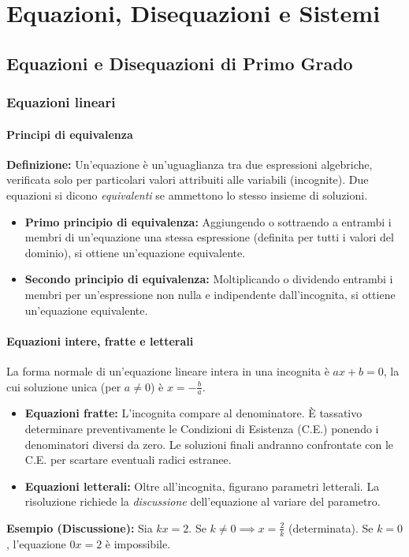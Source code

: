 \chapter{Equazioni, Disequazioni e Sistemi}

\section{Equazioni e Disequazioni di Primo Grado}
\subsection{Equazioni lineari}
\subsubsection{Principi di equivalenza}
\textbf{Definizione:} Un'equazione è un'uguaglianza tra due espressioni algebriche, verificata solo per particolari valori attribuiti alle variabili (incognite). Due equazioni si dicono \textit{equivalenti} se ammettono lo stesso insieme di soluzioni.
\begin{itemize}
    \item \textbf{Primo principio di equivalenza:} Aggiungendo o sottraendo a entrambi i membri di un'equazione una stessa espressione (definita per tutti i valori del dominio), si ottiene un'equazione equivalente.
    \item \textbf{Secondo principio di equivalenza:} Moltiplicando o dividendo entrambi i membri per un'espressione non nulla e indipendente dall'incognita, si ottiene un'equazione equivalente.
\end{itemize}

\subsubsection{Equazioni intere, fratte e letterali}
La forma normale di un'equazione lineare intera in una incognita è $ax + b = 0$, la cui soluzione unica (per $a \neq 0$) è $x = -\frac{b}{a}$.
\begin{itemize}
    \item \textbf{Equazioni fratte:} L'incognita compare al denominatore. È tassativo determinare preventivamente le Condizioni di Esistenza (C.E.) ponendo i denominatori diversi da zero. Le soluzioni finali andranno confrontate con le C.E. per scartare eventuali radici estranee.
    \item \textbf{Equazioni letterali:} Oltre all'incognita, figurano parametri letterali. La risoluzione richiede la \textit{discussione} dell'equazione al variare del parametro.
\end{itemize}
\textbf{Esempio (Discussione):} Sia $kx = 2$. Se $k \neq 0 \implies x = \frac{2}{k}$ (determinata). Se $k = 0$, l'equazione $0x = 2$ è impossibile.

